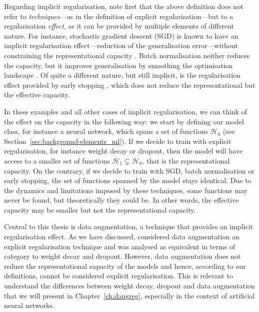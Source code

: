 {Regarding implicit regularisation, note first that the above definition does not refer to \textit{techniques}---as in the definition of explicit regularisation---but to a regularisation \textit{effect}, as it can be provided by multiple elements of different nature. For instance, stochastic gradient descent (SGD) is known to have an implicit regularisation effect---reduction of the generalisation error---without constraining the representational capacity \citep{zhang2017sgd}. Batch normalisation neither reduces the capacity, but it improves generalisation by smoothing the optimisation landscape \citep{santurkar2018bn}. Of quite a different nature, but still implicit, is the regularisation effect provided by early stopping \citep{yao2007earlystopping}, which does not reduce the representational but the effective capacity.

In these examples and all other cases of implicit regularisation, we can think of the effect on the capacity in the following way: we start by defining our model class, for instance a neural network, which spans a set of functions $\mathcal{H}_0$ (see Section~\ref{sec:background-elements_ml}). If we decide to train with explicit regularisation, for instance weight decay or dropout, then the model will have access to a smaller set of functions $\mathcal{H}_1 \subsetneq \mathcal{H}_0$, that is the representational capacity. On the contrary, if we decide to train with SGD, batch normalisation or early stopping, the set of functions spanned by the model stays identical. Due to the dynamics and limitations imposed by these techniques, some functions may never be found, but theoretically they could be. In other words, the effective capacity may be smaller but not the representational capacity.

Central to this thesis is data augmentation, a technique that provides an implicit regularisation effect. As we have discussed, \citet{zhang2016understandingdl} considered data augmentation an explicit regularisation technique and was analysed as equivalent in terms of category to weight decay and dropout. However, data augmentation does not reduce the representational capacity of the models and hence, according to our definitions, cannot be considered explicit regularisation. This is relevant to understand the differences between weight decay, dropout and data augmentation that we will present in Chapter~\ref{ch:daugreg}, especially in the context of artificial neural networks.

}
